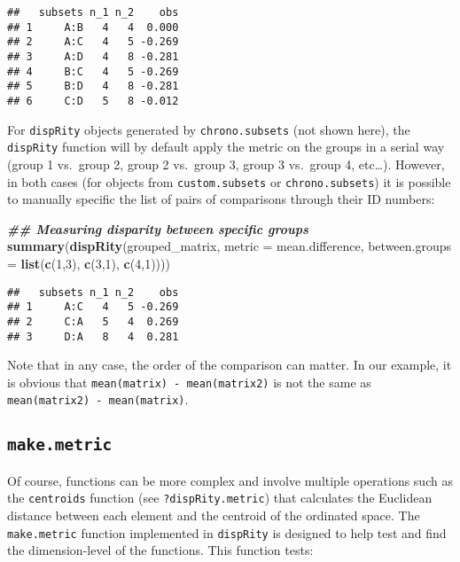 \documentclass[
]{book}
\newenvironment{Shaded}{\begin{snugshade}}{\end{snugshade}}
\newcommand{\AttributeTok}[1]{\textcolor[rgb]{0.13,0.29,0.53}{#1}}
\newcommand{\DecValTok}[1]{\textcolor[rgb]{0.00,0.00,0.81}{#1}}
\newcommand{\DocumentationTok}[1]{\textcolor[rgb]{0.56,0.35,0.01}{\textbf{\textit{#1}}}}
\newcommand{\FunctionTok}[1]{\textcolor[rgb]{0.13,0.29,0.53}{\textbf{#1}}}
\newcommand{\NormalTok}[1]{#1}
\begin{document}
\begin{verbatim}
##   subsets n_1 n_2    obs
## 1     A:B   4   4  0.000
## 2     A:C   4   5 -0.269
## 3     A:D   4   8 -0.281
## 4     B:C   4   5 -0.269
## 5     B:D   4   8 -0.281
## 6     C:D   5   8 -0.012
\end{verbatim}

For \texttt{dispRity} objects generated by \texttt{chrono.subsets} (not shown here), the \texttt{dispRity} function will by default apply the metric on the groups in a serial way (group 1 vs.~group 2, group 2 vs.~group 3, group 3 vs.~group 4, etc\ldots).
However, in both cases (for objects from \texttt{custom.subsets} or \texttt{chrono.subsets}) it is possible to manually specific the list of pairs of comparisons through their ID numbers:

\begin{Shaded}
\begin{Highlighting}[]
\DocumentationTok{\#\# Measuring disparity between specific groups}
\FunctionTok{summary}\NormalTok{(}\FunctionTok{dispRity}\NormalTok{(grouped\_matrix, }\AttributeTok{metric =}\NormalTok{ mean.difference,}
                 \AttributeTok{between.groups =} \FunctionTok{list}\NormalTok{(}\FunctionTok{c}\NormalTok{(}\DecValTok{1}\NormalTok{,}\DecValTok{3}\NormalTok{), }\FunctionTok{c}\NormalTok{(}\DecValTok{3}\NormalTok{,}\DecValTok{1}\NormalTok{), }\FunctionTok{c}\NormalTok{(}\DecValTok{4}\NormalTok{,}\DecValTok{1}\NormalTok{))))}
\end{Highlighting}
\end{Shaded}

\begin{verbatim}
##   subsets n_1 n_2    obs
## 1     A:C   4   5 -0.269
## 2     C:A   5   4  0.269
## 3     D:A   8   4  0.281
\end{verbatim}

Note that in any case, the order of the comparison can matter.
In our example, it is obvious that \texttt{mean(matrix)\ -\ mean(matrix2)} is not the same as \texttt{mean(matrix2)\ -\ mean(matrix)}.

\hypertarget{makemetric}{%
\subsection{\texorpdfstring{\texttt{make.metric}}{make.metric}}\label{makemetric}}

Of course, functions can be more complex and involve multiple operations such as the \texttt{centroids} function (see \texttt{?dispRity.metric}) that calculates the Euclidean distance between each element and the centroid of the ordinated space.
The \texttt{make.metric} function implemented in \texttt{dispRity} is designed to help test and find the dimension-level of the functions.
This function tests:
\end{document}
